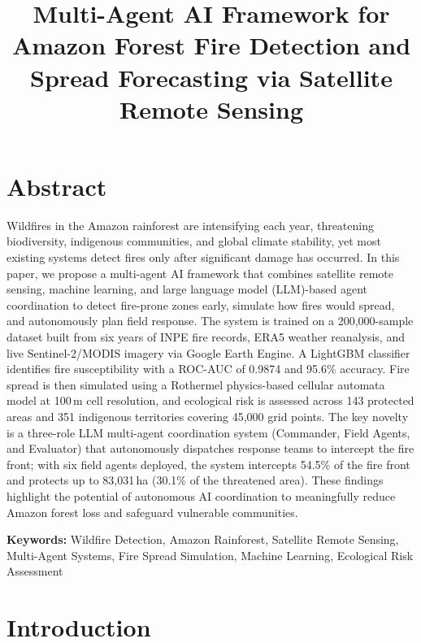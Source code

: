 \documentclass[12pt,a4paper]{article}
\title{\textbf{Multi-Agent AI Framework for Amazon Forest Fire Detection and Spread Forecasting via Satellite Remote Sensing}}
\author{}
\date{}
\begin{document}
\maketitle
\thispagestyle{empty}

\section*{Abstract}

Wildfires in the Amazon rainforest are intensifying each year, threatening biodiversity, indigenous communities, and global climate stability, yet most existing systems detect fires only after significant damage has occurred. In this paper, we propose a multi-agent AI framework that combines satellite remote sensing, machine learning, and large language model (LLM)-based agent coordination to detect fire-prone zones early, simulate how fires would spread, and autonomously plan field response. The system is trained on a 200,000-sample dataset built from six years of INPE fire records, ERA5 weather reanalysis, and live Sentinel-2/MODIS imagery via Google Earth Engine. A LightGBM classifier identifies fire susceptibility with a ROC-AUC of 0.9874 and 95.6\% accuracy. Fire spread is then simulated using a Rothermel physics-based cellular automata model at 100\,m cell resolution, and ecological risk is assessed across 143 protected areas and 351 indigenous territories covering 45,000 grid points. The key novelty is a three-role LLM multi-agent coordination system (Commander, Field Agents, and Evaluator) that autonomously dispatches response teams to intercept the fire front; with six field agents deployed, the system intercepts 54.5\% of the fire front and protects up to 83,031\,ha (30.1\% of the threatened area). These findings highlight the potential of autonomous AI coordination to meaningfully reduce Amazon forest loss and safeguard vulnerable communities.

\medskip
\noindent\textbf{Keywords:} Wildfire Detection, Amazon Rainforest, Satellite Remote Sensing, Multi-Agent Systems, Fire Spread Simulation, Machine Learning, Ecological Risk Assessment

\section{Introduction}
\end{document}
